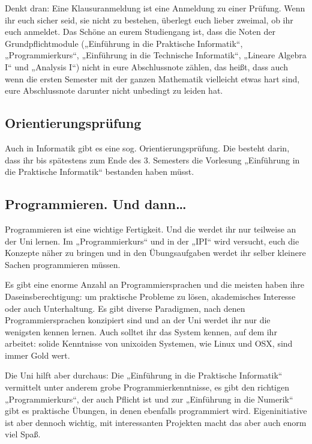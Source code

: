 Denkt dran: Eine Klausuranmeldung ist eine Anmeldung zu einer Prüfung. Wenn ihr
euch sicher seid, sie nicht zu bestehen, überlegt euch lieber zweimal, ob ihr
euch anmeldet. Das Schöne an eurem Studiengang ist, dass die Noten der
Grundpflichtmodule („Einführung in die Praktische Informatik“, „Programmierkurs“,
„Einführung in die Technische Informatik“, „Lineare Algebra I“ und „Analysis I“)
nicht in eure Abschlussnote zählen, das heißt, dass auch
wenn die ersten Semester mit der ganzen Mathematik vielleicht etwas hart sind,
eure Abschlussnote darunter nicht unbedingt zu leiden hat.


\subsection{Orientierungsprüfung}

Auch in Informatik gibt es eine sog. Orientierungsprüfung. Die besteht darin,
dass ihr bis spätestens zum Ende des 3. Semesters die Vorlesung
„Einführung in die Praktische Informatik“ bestanden haben müsst.


\subsection{Programmieren. Und dann\dots}

Programmieren ist eine wichtige Fertigkeit. Und die werdet ihr nur teilweise an
der Uni lernen. Im „Programmierkurs“ und in der „IPI“ wird versucht, euch die
Konzepte näher zu bringen und in den Übungsaufgaben werdet ihr selber kleinere
Sachen programmieren müssen.

Es gibt eine enorme Anzahl an Programmiersprachen und die meisten haben ihre
Daseinsberechtigung: um praktische Probleme zu lösen, akademisches Interesse
oder auch Unterhaltung. Es gibt diverse Paradigmen, nach denen
Programmiersprachen konzipiert sind und an der Uni werdet ihr nur die wenigsten
kennen lernen. Auch solltet ihr das System kennen, auf dem ihr arbeitet: solide
Kenntnisse von unixoiden Systemen, wie Linux und OSX, sind immer Gold wert.

Die Uni hilft aber durchaus: Die „Einführung in die Praktische Informatik“
vermittelt unter anderem grobe Programmierkenntnisse, es gibt den richtigen „Programmierkurs“,
der auch Pflicht ist und zur „Einführung in die Numerik“ gibt es praktische Übungen, in denen
ebenfalls programmiert wird. Eigeninitiative ist aber dennoch wichtig,
mit interessanten Projekten macht das aber auch enorm viel Spaß.

\vspace{-\parskip}
